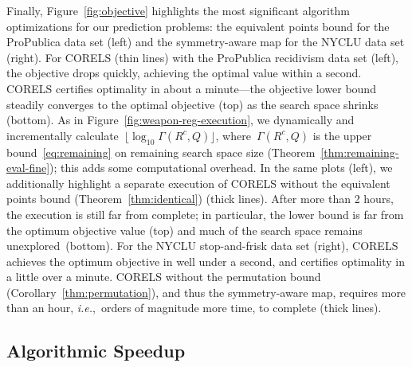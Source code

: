 \documentclass[twoside,11pt]{article}
\def\ie{{\it i.e.},~}
\def\CurrentObj{{R^c}}
\def\Remaining{\Gamma}
\def\Queue{Q}
\begin{document}
Finally, Figure~\ref{fig:objective} highlights the most significant
algorithm optimizations for our prediction problems:
the equivalent points bound for the ProPublica data set (left)
and the symmetry-aware map for the NYCLU data set (right).
%
For CORELS (thin lines) with the ProPublica recidivism data set (left),
the objective drops quickly, achieving the optimal value within a second.
CORELS certifies optimality in about a minute---the objective lower bound
steadily converges to the optimal objective (top) as the search space shrinks (bottom).
%
As in Figure~\ref{fig:weapon-reg-execution}, we dynamically and incrementally
calculate~$\lfloor \log_{10} \Remaining(\CurrentObj, \Queue) \rfloor$,
where~$\Remaining(\CurrentObj, \Queue)$
is the upper bound~\eqref{eq:remaining} on remaining search space size
(Theorem~\ref{thm:remaining-eval-fine}); this adds some computational overhead.
%
In the same plots (left), we additionally highlight
a separate execution of CORELS without the equivalent points bound
(Theorem~\ref{thm:identical}) (thick lines).
%
After more than 2 hours, the execution is still far from complete;
in particular, the lower bound is far from the optimum objective value (top)
and much of the search space remains unexplored~(bottom).
%
For the NYCLU stop-and-frisk data set (right),
CORELS achieves the optimum objective in well under a second,
and certifies optimality in a little over a minute.
%
CORELS without the permutation bound (Corollary~\ref{thm:permutation}),
and thus the symmetry-aware map,
requires more than an hour, \ie orders of magnitude more time, to complete (thick lines).

\subsection{Algorithmic Speedup}
\label{sec:speedup}
\end{document}

